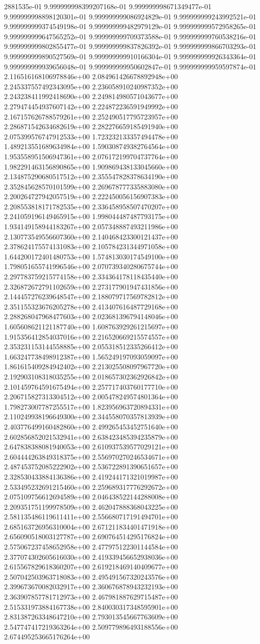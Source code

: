 2881535e-01	9.999999998399207168e-01	9.999999998671349477e-01	9.999999998898120301e-01	9.999999999086924829e-01	9.999999999243992521e-01	9.999999999374549198e-01	9.999999999482979129e-01	9.999999999572958265e-01	9.999999999647565252e-01	9.999999999709373588e-01	9.999999999760538216e-01	9.999999999802855477e-01	9.999999999837826392e-01	9.999999999866703293e-01	9.999999999890527569e-01	9.999999999910166304e-01	9.999999999926343364e-01	9.999999999939656048e-01	9.999999999950602847e-01	9.999999999959597874e-01
2.116516168106978846e+00	2.084961426678892948e+00	2.245337557492343095e+00	2.236058910240987352e+00	2.243238411992418690e+00	2.249814980571043677e+00	2.279474454937607142e+00	2.224872236591949992e+00	2.167157626788579261e+00	2.252490517795723957e+00	2.286871542634682619e+00	2.282276659185491940e+00	2.075399576747912533e+00	1.723232133357494478e+00	1.489213551689634984e+00	1.590308749382764564e+00	1.953558951506947361e+00	2.076172199704737764e+00	1.982291463156890865e+00	1.909869438133045660e+00	2.134875290680517512e+00	2.355547828378634190e+00	2.352845628570101599e+00	2.269678777335883080e+00	2.200264727942057519e+00	2.222450056156907383e+00	2.208553818171782535e+00	2.336458958507470207e+00	2.241059196149465915e+00	1.998044487487793175e+00	1.934149158944183267e+00	2.057348887493211986e+00	2.130773549556607360e+00	2.140468423300121437e+00	2.378624175574131083e+00	2.105784231344971058e+00	1.644200172401480753e+00	1.574813030174549100e+00	1.798051655741996546e+00	2.070739340280675744e+00	2.297783759215774158e+00	2.334364178118435440e+00	2.326872672791102659e+00	2.273177901947431856e+00	2.144457276239648547e+00	2.188079717569782812e+00	2.351155323676205278e+00	2.413407616487729168e+00	2.288268047968477603e+00	2.023681396794148046e+00	1.605608621121187740e+00	1.608763929261215697e+00	1.915356412854037016e+00	2.216520669215574557e+00	2.353231153144558885e+00	2.055318512335266412e+00	1.663247738498912387e+00	1.565249197093059097e+00	1.861615409284942402e+00	2.213025508097967720e+00	2.192903108318035255e+00	2.018657302362926842e+00	2.101459764591675494e+00	2.257717403760177710e+00	2.206715827313304512e+00	2.005478249574801364e+00	1.798273007787255517e+00	1.823956963720894331e+00	2.110249938196649300e+00	2.344558070357813939e+00	2.403776499160482860e+00	2.499265453452751640e+00	2.602856852021532941e+00	2.638423485394235879e+00	2.647838388081940053e+00	2.610937539577029121e+00	2.604444263849318375e+00	2.556970270246534671e+00	2.487453752085222902e+00	2.536722891390651657e+00	2.328530433884136386e+00	2.419244171321019987e+00	2.533495232691215460e+00	2.259689317776292672e+00	2.075109756612694589e+00	2.046438522144288008e+00	2.209351751199978509e+00	2.462047888368043225e+00	2.581135486119611411e+00	2.556680717191494701e+00	2.685163726956310004e+00	2.671211834401471918e+00	2.656090518003127787e+00	2.690764514295176824e+00	2.575067237458652958e+00	2.477975122301144584e+00	2.377074302605616030e+00	2.419339456652938036e+00	2.615567829618360207e+00	2.619218469140409677e+00	2.507042503963718083e+00	2.495491567320243576e+00	2.399673670082032917e+00	2.360676878943232193e+00	2.363907857781712973e+00	2.467981887629715487e+00	2.515331973884167738e+00	2.840030317348595901e+00	2.831387263348647210e+00	2.793013545667763609e+00	2.547747417219363264e+00	2.509779896493188556e+00	2.674495253665176264e+00